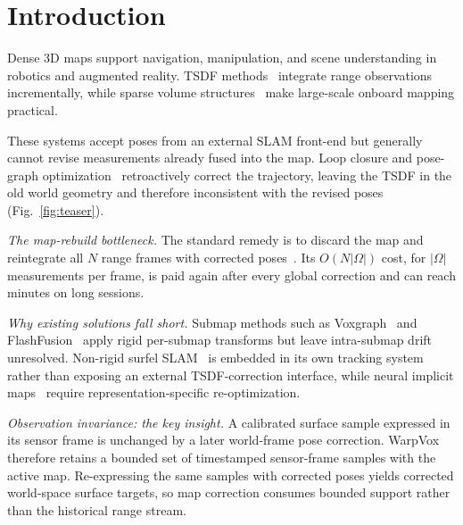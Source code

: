 \section{Introduction}
\label{sec:intro}

Dense 3D maps support navigation, manipulation, and scene understanding in robotics and augmented reality. TSDF methods~\cite{10.1145/3596711.3596726,newcombe2011kinectfusion} integrate range observations incrementally, while sparse volume structures~\cite{10.1145/2508363.2508374,Oleynikova_2017,vizzo2022vdbfusion} make large-scale onboard mapping practical.

These systems accept poses from an external SLAM front-end but generally cannot revise measurements already fused into the map. Loop closure and pose-graph optimization~\cite{Campos_2021,5979949} retroactively correct the trajectory, leaving the TSDF in the old world geometry and therefore inconsistent with the revised poses (Fig.~\ref{fig:teaser}).

\vspace{1mm}\noindent\textit{The map-rebuild bottleneck.}
The standard remedy is to discard the map and reintegrate all $N$ range frames with corrected poses~\cite{Cramariuc_2023,rosinol2021kimeraslamspatialperception}. Its $O(N|\Omega|)$ cost, for $|\Omega|$ measurements per frame, is paid again after every global correction and can reach minutes on long sessions.

\vspace{1mm}\noindent\textit{Why existing solutions fall short.}
Submap methods such as Voxgraph~\cite{reijgwart2020voxgraph} and FlashFusion~\cite{han2018flashfusion} apply rigid per-submap transforms but leave intra-submap drift unresolved. Non-rigid surfel SLAM~\cite{whelan2016elasticfusion} is embedded in its own tracking system rather than exposing an external TSDF-correction interface, while neural implicit maps~\cite{sucar2021imap,zhu2022niceslam,liso2024loopyslam,bruns2024neuralgraphmap} require representation-specific re-optimization.

\vspace{1mm}\noindent\textit{Observation invariance: the key insight.}
A calibrated surface sample expressed in its sensor frame is unchanged by a later world-frame pose correction. WarpVox therefore retains a bounded set of timestamped sensor-frame samples with the active map. Re-expressing the same samples with corrected poses yields corrected world-space surface targets, so map correction consumes bounded support rather than the historical range stream.

